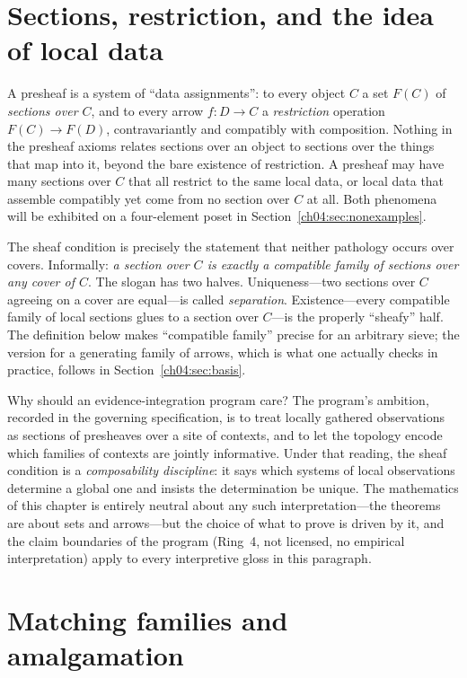 \section{Sections, restriction, and the idea of local data}\label{ch04:sec:idea}

A presheaf is a system of ``data assignments'': to every object $C$ a set
$F(C)$ of \emph{sections over $C$}, and to every arrow $f:D\to C$ a
\emph{restriction} operation $F(C)\to F(D)$, contravariantly and
compatibly with composition. Nothing in the presheaf axioms relates sections
over an object to sections over the things that map into it, beyond the bare
existence of restriction. A presheaf may have many sections over $C$ that all
restrict to the same local data, or local data that assemble compatibly yet
come from no section over $C$ at all. Both phenomena will be exhibited on a
four-element poset in Section~\ref{ch04:sec:nonexamples}.

The sheaf condition is precisely the statement that neither pathology occurs
over covers. Informally: \emph{a section over $C$ is exactly a compatible
family of sections over any cover of $C$}. The slogan has two halves.
Uniqueness---two sections over $C$ agreeing on a cover are equal---is called
\emph{separation}. Existence---every compatible family of local sections glues
to a section over $C$---is the properly ``sheafy'' half. The definition below
makes ``compatible family'' precise for an arbitrary sieve; the version for a
generating family of arrows, which is what one actually checks in practice,
follows in Section~\ref{ch04:sec:basis}.

Why should an evidence-integration program care? The program's ambition,
recorded in the governing specification, is to treat locally gathered
observations as sections of presheaves over a site of contexts, and to let the
topology encode which families of contexts are jointly informative. Under that
reading, the sheaf condition is a \emph{composability discipline}: it says
which systems of local observations determine a global one and insists the
determination be unique. The mathematics of this chapter is entirely neutral
about any such interpretation---the theorems are about sets and arrows---but
the choice of what to prove is driven by it, and the claim boundaries of the
program (Ring~4, not licensed, no empirical interpretation) apply to every
interpretive gloss in this paragraph.

\section{Matching families and amalgamation}\label{ch04:sec:matching}

